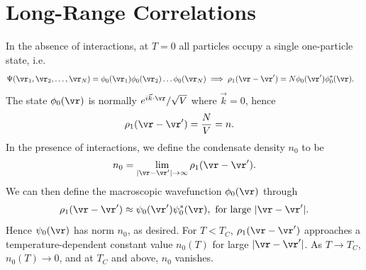\documentclass[a4paper, 11pt, normalem]{report}
\begin{document}
\section{Long-Range Correlations}
In the absence of interactions, at $T=0$ all particles occupy a single one-particle state, i.e.
\begin{align}
    \Psi(\vr_1,\vr_2,\dots,\vr_N) &= \phi_0(\vr_1)\phi_0(\vr_2)\dots\phi_0(\vr_N) \implies \rho_1(\vr-\vr') = N\phi_0(\vr')\phi_0^*(\vr).
\end{align}
The state $\phi_0(\vr)$ is normally $e^{i\vec{k}\cdot\vr}/\sqrt{V}$ where $\vec{k}=0$, hence
\begin{align}
    \rho_1(\vr-\vr') &= \frac{N}{V} = n.
\end{align}
In the presence of interactions, we define the condensate density $n_0$ to be
\begin{align}
    n_0 = \lim_{|\vr-\vr'|\to\infty} \rho_1(\vr-\vr').
\end{align}
We can then define the macroscopic wavefunction $\phi_0(\vr)$ through
\begin{align}
    \rho_1(\vr-\vr') \approx \psi_0(\vr')\psi_0^*(\vr), \text{ for large } |\vr-\vr'|.
\end{align}
Hence $\psi_0(\vr)$ has norm $n_0$, as desired.
For $T<T_C$, $\rho_1(\vr-\vr')$ approaches a temperature-dependent constant value $n_0(T)$ for large $|\vr-\vr'|$.
As $T\to T_C$, $n_0(T)\to0$, and at $T_C$ and above, $n_0$ vanishes.
\end{document}

